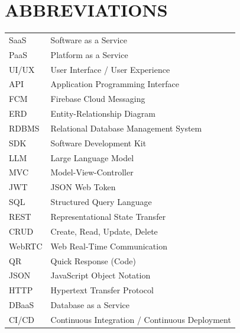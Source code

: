 \section*{ABBREVIATIONS}

\begin{tabular}{ll}
SaaS & Software as a Service \\
PaaS & Platform as a Service \\
UI/UX & User Interface / User Experience \\
API & Application Programming Interface \\
FCM & Firebase Cloud Messaging \\
ERD & Entity-Relationship Diagram \\
RDBMS & Relational Database Management System \\
SDK & Software Development Kit \\
LLM & Large Language Model \\
MVC & Model-View-Controller \\
JWT & JSON Web Token \\
SQL & Structured Query Language \\
REST & Representational State Transfer \\
CRUD & Create, Read, Update, Delete \\
WebRTC & Web Real-Time Communication \\
QR & Quick Response (Code) \\
JSON & JavaScript Object Notation \\
HTTP & Hypertext Transfer Protocol \\
DBaaS & Database as a Service \\
CI/CD & Continuous Integration / Continuous Deployment \\
\end{tabular}